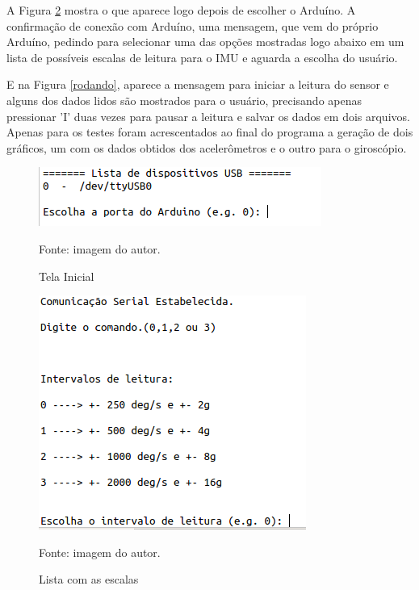 	A Figura \ref{lista_ranges} mostra o que aparece logo depois de escolher o Arduíno. A confirmação de conexão com Arduíno, uma mensagem, que vem do próprio Arduíno, pedindo para selecionar uma das opções mostradas logo abaixo em um lista de possíveis escalas de leitura para o IMU e aguarda a escolha do usuário.
	
	E na Figura \ref{rodando}, aparece a mensagem para iniciar a leitura do sensor e alguns dos dados lidos são mostrados para o usuário, precisando apenas pressionar 'I' duas vezes para pausar a leitura e salvar os dados em dois arquivos. Apenas para os testes foram acrescentados ao final do programa a geração de dois gráficos, um com os dados obtidos dos acelerômetros e o outro para o giroscópio. 
	 	
	 	\begin{figure}[h]
	 		\centering
	 		\includegraphics[keepaspectratio=true,scale=0.6]{figuras/tela_inicial.png}
	 		\caption{Tela Inicial}
	 		Fonte: imagem do autor. 
	 		\label{tela_inicial}	
	 	\end{figure}
	
	\begin{figure}[h]
		\centering
		\includegraphics[keepaspectratio=true,scale=0.6]{figuras/lista_ranges.png}
		\caption{Lista com as escalas}
		Fonte: imagem do autor. 
		\label{lista_ranges}	
	\end{figure}
	
